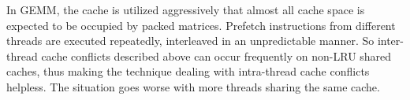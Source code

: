 In GEMM, the cache is utilized aggressively
that almost all cache space is expected to be occupied by packed matrices.
Prefetch instructions from different threads are executed repeatedly,
interleaved in an unpredictable manner.
So inter-thread cache conflicts described above
can occur frequently on non-LRU shared caches,
thus making the technique dealing with intra-thread cache conflicts helpless.
The situation goes worse with more threads sharing the same cache.

